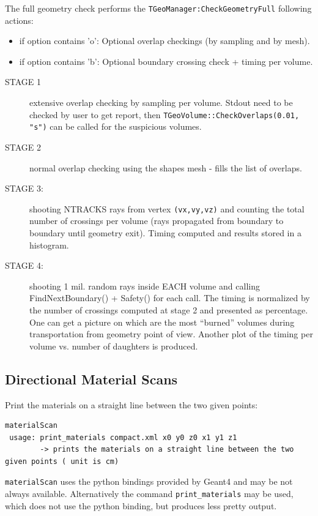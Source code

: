 The full geometry check performs the \texttt{TGeoManager:CheckGeometryFull} following actions:
\begin{itemize}
\item if option contains 'o': Optional overlap checkings (by sampling and by mesh).
\item if option contains 'b': Optional boundary crossing check + timing per volume.
\end{itemize}
\begin{description}
\item[STAGE 1] extensive overlap checking by sampling per volume. Stdout need to be checked by user to get report, then \texttt{TGeoVolume::CheckOverlaps(0.01, "s")} can be called for the suspicious volumes.
\item[STAGE 2] normal overlap checking using the shapes mesh - fills the list of overlaps.
\item[STAGE 3:] shooting NTRACKS rays from vertex \texttt{(vx,vy,vz)} and counting the total number of crossings per volume (rays propagated from boundary to boundary until geometry exit). Timing computed and results stored in a histogram.
\item[STAGE 4:] shooting 1 mil. random rays inside EACH volume and calling FindNextBoundary() + Safety() for each call. The timing is normalized by the number of crossings computed at stage 2 and presented as percentage. One can get a picture on which are the most ``burned'' volumes during transportation from geometry point of view. Another plot of the timing per volume vs. number of daughters is produced.
\end{description}

\subsection{Directional Material Scans}
\label{sec:dd4hep-manual-directional-material-scans}

Print the materials on a straight line between the two given points:
\begin{verbatim}
materialScan
 usage: print_materials compact.xml x0 y0 z0 x1 y1 z1 
        -> prints the materials on a straight line between the two given points ( unit is cm) 
\end{verbatim}
\texttt{materialScan} uses the python bindings provided by Geant4 and may be not  always available. Alternatively the command \texttt{print\_materials} may be used, which does not use the python binding, but produces less pretty output.


